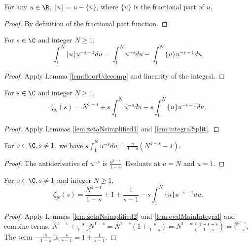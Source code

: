 \begin{lemma}\label{lem:floorUdecomp}
\leanok
For any $u\in\R$, $\lfloor u \rfloor = u - \{u\}$, where $\{u\}$ is the fractional part of $u$.
\end{lemma}
\begin{proof}
\leanok
By definition of the fractional part function.
\end{proof}

\begin{lemma}\label{lem:integralSplit}
\leanok
For $s\in\C$ and integer $N\ge 1$,
\[ \int_1^N \lfloor u \rfloor u^{-s-1} du = \int_1^N u^{-s} du - \int_1^N \{u\} u^{-s-1} du. \]
\end{lemma}
\begin{proof}
\leanok
Apply Lemma \ref{lem:floorUdecomp} and linearity of the integral.
\end{proof}

\begin{lemma}\label{lem:zetaNsimplified2}
\leanok
{}
For $s\in\C$ and integer $N\ge 1$,
\[ \zeta_N(s) = N^{1-s} + s \int_1^N u^{-s} du - s \int_1^N \{u\} u^{-s-1} du. \]
\end{lemma}
\begin{proof}
\leanok
Apply Lemmas \ref{lem:zetaNsimplified1} and \ref{lem:integralSplit}.
\end{proof}

\begin{lemma}\label{lem:evalMainIntegral}
\leanok
For $s\in\C, s\neq 1$, we have $s \int_1^N u^{-s} du = \frac{s}{1-s}(N^{1-s} - 1)$.
\end{lemma}
\begin{proof}
\leanok
The antiderivative of $u^{-s}$ is $\frac{u^{1-s}}{1-s}$. Evaluate at $u=N$ and $u=1$.
\end{proof}

\begin{lemma}\label{lem:zetaNfinal}
\leanok
{}
For $s\in\C, s\neq 1$ and integer $N\ge 1$,
\[ \zeta_N(s) = \frac{N^{1-s}}{1-s} + 1+\frac{1}{s-1} - s \int_1^N \{u\} u^{-s-1} du. \]
\end{lemma}
\begin{proof}
\leanok
Apply Lemmas \ref{lem:zetaNsimplified2} and \ref{lem:evalMainIntegral} and combine terms:
$N^{1-s} + \frac{s}{1-s}N^{1-s} = N^{1-s}(1+\frac{s}{1-s}) = N^{1-s}(\frac{1-s+s}{1-s}) = \frac{N^{1-s}}{1-s}$.
The term $-\frac{s}{1-s}$ is $\frac{s}{s-1}=1+\frac{1}{s-1}$.
\end{proof}

